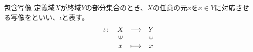 \documentclass[../../../topic_linear-algebra]{subfiles}
\begin{document}
\begin{definition}{包含写像}
  定義域$X$が終域$Y$の部分集合のとき、$X$の任意の元$x$を$x \in Y$に対応させる写像をといい、$\iota$と表す。
  \begin{equation*}
  \begin{array}{lclc}
    \iota \colon & X         & \longrightarrow & Y          \\
            & \rotatebox{90}{$\in$} &                 & \rotatebox{90}{$\in$} \\
            & x              & \longmapsto     & x
  \end{array}
\end{equation*}
\end{definition}
\end{document}
